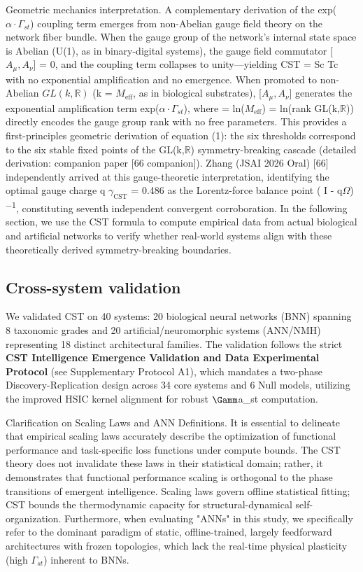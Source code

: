 \documentclass[a4paper,12pt]{article}
\begin{document}
Geometric mechanics interpretation.
A complementary derivation of the exp($\alpha \cdot \Gamma_{st}$) coupling term emerges from non-Abelian gauge field theory on the network fiber bundle.
When the gauge group of the network's internal state space is Abelian (U(1), as in binary-digital systems), the gauge field commutator [$A_{\mu}, A_{\nu}$] = 0, and the coupling term collapses to unity---yielding CST = Sc \cdot Tc with no exponential amplification and no emergence.
When promoted to non-Abelian $GL(k, \mathbb{R})$ (k = $M_{\text{eff}}$, as in biological substrates), [$A_{\mu}, A_{\nu}$]   generates the exponential amplification term exp($\alpha \cdot \Gamma_{st}$), where  \alpha  = ln($M_{\text{eff}}$) = ln(rank GL(k,$\mathbb{R}$)) directly encodes the gauge group rank with no free parameters.
This provides a first-principles geometric derivation of equation (1): the six thresholds correspond to the six stable fixed points of the GL(k,$\mathbb{R}$) symmetry-breaking cascade (detailed derivation: companion paper [66 companion]).
Zhang (JSAI 2026 Oral) [66] independently arrived at this gauge-theoretic interpretation, identifying the optimal gauge charge q  \approx  $\gamma_{\text{CST}}$ = 0.486 as the Lorentz-force balance point ( \gamma I - q$\Omega$)\textsuperscript{$-$}\textsuperscript{1}, constituting seventh independent convergent corroboration.
In the following section, we use the CST formula to compute empirical data from actual biological and artificial networks to verify whether real-world systems align with these theoretically derived symmetry-breaking boundaries.

\subsection{Cross-system validation}

We validated CST on 40 systems: 20 biological neural networks (BNN) spanning 8 taxonomic grades and 20 artificial/neuromorphic systems (ANN/NMH) representing 18 distinct architectural families.
The validation follows the strict \textbf{CST Intelligence Emergence Validation and Data Experimental Protocol} (see Supplementary Protocol A1), which mandates a two-phase Discovery-Replication design across 34 core systems and 6 Null models, utilizing the improved HSIC kernel alignment for robust $\Gamm$a_{st} computation.

Clarification on Scaling Laws and ANN Definitions.
It is essential to delineate that empirical scaling laws accurately describe the optimization of functional performance and task-specific loss functions under compute bounds.
The CST theory does not invalidate these laws in their statistical domain; rather, it demonstrates that functional performance scaling is orthogonal to the phase transitions of emergent intelligence.
Scaling laws govern offline statistical fitting; CST bounds the thermodynamic capacity for structural-dynamical self-organization.
Furthermore, when evaluating "ANNs" in this study, we specifically refer to the dominant paradigm of static, offline-trained, largely feedforward architectures with frozen topologies, which lack the real-time physical plasticity (high $\Gamma_{st}$) inherent to BNNs.
\end{document}
